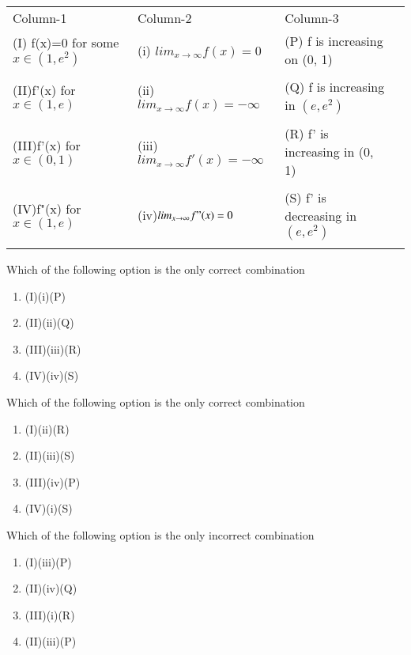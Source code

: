 \begin{center}
\begin{tabular}{llll}
Column-1 & Column-2 & Column-3\\
(I) f(x)=0 for some $x \in (1, e^2)$   &(i) $lim_{x \to \infty}f(x)=0$         &(P) f is increasing on (0, 1)\\
&&&\\
(II)f'(x) for $x \in (1, e)$           &(ii)$lim_{x \to \infty}f(x)=-\infty$   &(Q) f is increasing in $(e, e^2)$\\
&&&\\
(III)f'(x) for $x \in(0, 1)$           &(iii)$lim_{x \to \infty}f'(x)=-\infty$ &(R) f' is increasing in (0, 1)\\
&&&\\
(IV)f"(x) for $x \in (1, e)$           &(iv)$lim_{x \to \infty}f"(x)=0$        &(S) f' is decreasing in $(e, e^2)$\\
&&&\\
\end{tabular}
\end{center}

\item Which of the following option is the only correct combination
\begin{enumerate}
    \item (I)(i)(P)                \item (II)(ii)(Q)
    \item (III)(iii)(R)            \item (IV)(iv)(S)
\end{enumerate}
\item Which of the following option is the only correct combination
\begin{enumerate}
    \item (I)(ii)(R)
    \item (II)(iii)(S)
    \item (III)(iv)(P)
    \item (IV)(i)(S)
\end{enumerate}
\item Which of the following option is the only incorrect combination
\begin{enumerate}
    \item (I)(iii)(P)
    \item (II)(iv)(Q)
    \item (III)(i)(R)
    \item (II)(iii)(P)
\end{enumerate}


